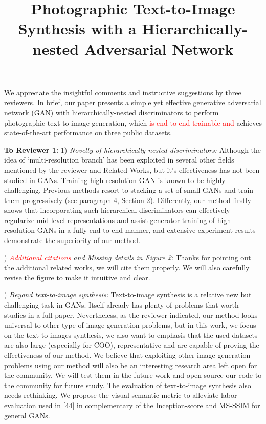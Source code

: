 \documentclass[10pt,twocolumn,letterpaper]{article}
\begin{document}
\title{Photographic Text-to-Image Synthesis with a Hierarchically-nested Adversarial Network}  %

\maketitle
\thispagestyle{empty}

\noindent
We appreciate the insightful comments and instructive suggestions by three reviewers. In brief, our paper presents a simple yet effective generative adversarial network (GAN) with hierarchically-nested discriminators to perform photographic text-to-image generation, which \textcolor{red}{is end-to-end trainable and} achieves state-of-the-art performance on three public datasets.

\noindent
\textbf{To Reviewer 1:} 1) \textit{Novelty of hierarchically nested discriminators:} Although the idea of `multi-resolution branch' has been exploited in several other fields mentioned by the reviewer and Related Works, but it's effectiveness has not been studied in GANs.
Training high-resolution GAN is known to be highly challenging. Previous methods resort to stacking a set of small GANs and train them progressively (see paragraph 4, Section 2). Differently, our method firstly shows that incorporating such hierarchical discriminators can effectively regularize mid-level representations and assist generator training of high-resolution GANs in a fully end-to-end manner, and extensive experiment results demonstrate the superiority of our method.

) \textit{\textcolor{red}{Additional citations} and Missing details in Figure 2}: Thanks for pointing out the additional related works, we will cite them properly. We will also carefully revise the figure to make it intuitive and clear.

) \textit{Beyond text-to-image synthesis:} Text-to-image synthesis is a relative new but challenging task in GANs. Itself already has plenty of problems that worth studies in a full paper. 
Nevertheless, as the reviewer indicated, our method looks universal to other type of image generation problems, but in this work, we focus on the text-to-images synthesis,  we also want to emphasis that the used datasets are also large (especially for COO), representative and are capable of proving the effectiveness of our method. 
We believe that exploiting other image generation problems using our method will also be an interesting research area left open for the community. We will test them in the future work and open source our code to the community for future study.
The evaluation of text-to-image synthesis also needs rethinking. We propose the visual-semantic metric to alleviate labor evaluation used in [44] in complementary of the Inception-score and MS-SSIM for general GANs.
\end{document}
